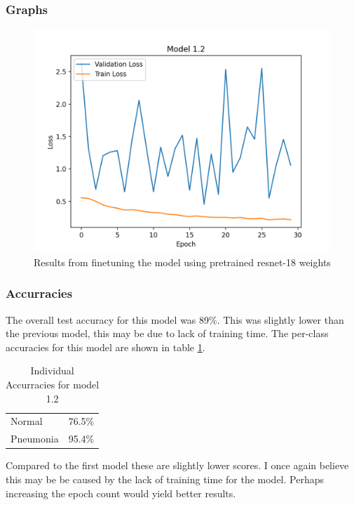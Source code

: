 \documentclass[twocolumn]{article}
\begin{document}
\subsubsection{Graphs}

\begin{figure}[!htb]
	\centering
	\includegraphics[scale=0.45]{model-1.2.png}
	\caption{Results from finetuning the model using pretrained resnet-18 weights}
	\label{fig:res2}
\end{figure}

\subsubsection{Accurracies}

The overall test accuracy for this model was 89\%. This was slightly lower than the previous model, this may be due to lack of training time. The per-class accuracies for this model are shown in table \ref{tab:2}.

\begin{table}[h]
    \begin{tabular}{ll}
        Normal    & 76.5\% \\
        Pneumonia & 95.4\%
    \end{tabular}
    \caption{Individual Accurracies for model 1.2}
    \label{tab:2}
\end{table}

Compared to the first model these are slightly lower scores. I once again believe this may be be caused by the lack of training time for the model. Perhaps increasing the epoch count would yield better results.




	
\end{document}
